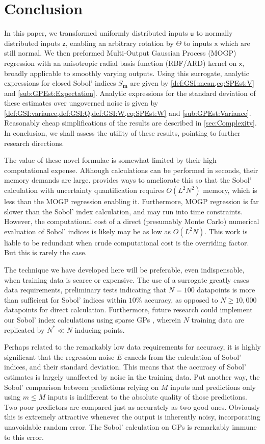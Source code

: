 \documentclass[preprint,12pt]{elsarticle}
\newcommand*{\mi}[1]{\mathbf{#1}}
\newcommand*{\rv}[1]{\mathsf{#1}}
\begin{document}
\section{Conclusion}\label{sec:Conc}
    In this paper, we transformed uniformly distributed inputs $\rv{u}$ to normally distributed inputs $\rv{z}$, enabling an arbitrary rotation by $\Theta$ to inputs $\rv{x}$ which are still normal. We then preformed Multi-Output Gaussian Process (MOGP) regression with an anisotropic radial basis function (RBF/ARD) kernel on $\rv{x}$, broadly applicable to smoothly varying outputs. Using this surrogate, analytic expressions for closed Sobol' indices $S_{\mi{m}}$ are given by \cref{def:GSI:mean,eq:SPEst:V} and \cref{sub:GPEst:Expectation}. Analytic expressions for the standard deviation of these estimates over ungoverned noise is given by \cref{def:GSI:variance,def:GSI:Q,def:GSI:W,eq:SPEst:W} and \cref{sub:GPEst:Variance}. Reasonably cheap simplifications of the results are described in \cref{sec:Complexity}.
    In conclusion, we shall assess the utility of these results, pointing to further research directions.

    The value of these novel formulae is somewhat limited by their high computational expense. Although calculations can be performed in seconds, their memory demands are large.  provides ways to ameliorate this so that the Sobol' calculation with uncertainty quantification requires $O(L^{2}N^{2})$ memory, which is less than the MOGP regression enabling it. Furthermore, MOGP regression is far slower than the Sobol' index calculation, and may run into time constraints. However, the computational cost of a direct (presumably Monte Carlo) numerical evaluation of Sobol' indices is likely may be as low as $O(L^{2}N)$. This work is liable to be redundant when crude computational cost is the overriding factor. But this is rarely the case.

    The technique we have developed here will be preferable, even indispensable, when training data is scarce or expensive. The use of a surrogate greatly eases data requirements, preliminary tests indicating that $N=100$ datapoints is more than sufficient for Sobol' indices within $10\%$ accuracy, as opposed to $N\geq 10,000$ datapoints for direct calculation. Furthermore, future research could implement our Sobol' index calculations using sparse GPs \cite{Snelson.Ghahramani2006,titsias2009,Hensman2013}, wherein $N$ training data are replicated by $N^{*} \ll N$ inducing points.

    Perhaps related to the remarkably low data requirements for accuracy, it is highly significant that the regression noise $E$ cancels from the calculation of Sobol' indices, and their standard deviation. This means that the accuracy of Sobol' estimates is largely unaffected by noise in the training data. Put another way, the Sobol' comparison between predictions relying on $M$ inputs and predictions only using $m \leq M$ inputs is indifferent to the absolute quality of those predictions. Two poor predictors are compared just as accurately as two good ones. Obviously this is extremely attractive whenever the output is inherently noisy, incorporating unavoidable random error. The Sobol' calculation on GPs is remarkably immune to this error.
\end{document}
